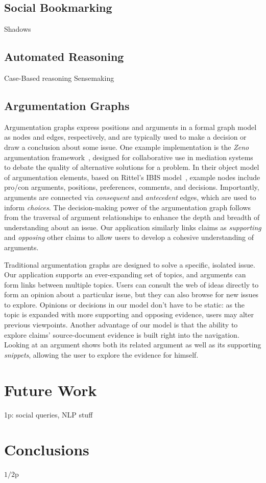 \documentclass{chi2009}
\begin{document}
\subsection{Social Bookmarking}

Shadows


\subsection{Automated Reasoning}

Case-Based reasoning
Sensemaking

\subsection{Argumentation Graphs}
Argumentation graphs express positions and arguments in a formal graph model as nodes and edges, respectively, and are typically used to make a decision or draw a conclusion about some issue. One example implementation is the {\it Zeno} argumentation framework~\cite{zeno}, designed for collaborative use in mediation systems to debate the quality of alternative solutions for a problem. In their object model of argumentation elements, based on Rittel's IBIS model~\cite{ibis}, example nodes include pro/con arguments, positions, preferences, comments, and decisions. Importantly, arguments are connected via {\it consequent} and {\it antecedent} edges, which are used to inform {\it choices}. The decision-making power of the argumentation graph follows from the traversal of argument relationships to enhance the depth and breadth of understanding about an issue. Our application similarly links claims as {\it supporting} and {\it opposing} other claims to allow users to develop a cohesive understanding of arguments.

Traditional argumentation graphs are designed to solve a specific, isolated issue. Our application supports an ever-expanding set of topics, and arguments can form links between multiple topics. Users can consult the web of ideas directly to form an opinion about a particular issue, but they can also browse for new issues to explore. Opinions or decisions in our model don't have to be static: as the topic is expanded with more supporting and opposing evidence, users may alter previous viewpoints. Another advantage of our model is that the ability to explore claims' source-document evidence is built right into the navigation. Looking at an argument shows both its related argument as well as its supporting {\it snippets}, allowing the user to explore the evidence for himself. 


\section{Future Work}
1p: social queries, NLP stuff

\section{Conclusions}
$1/2$p




\end{document}
